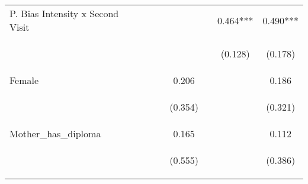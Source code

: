 \begin{center}
\begin{tabular}{lcccccc}
P. Bias Intensity x Second Visit &  &  &  &  & 0.464*** & 0.490*** \\
\vspace{4pt} & \begin{footnotesize}\end{footnotesize} & \begin{footnotesize}\end{footnotesize} & \begin{footnotesize}\end{footnotesize} & \begin{footnotesize}\end{footnotesize} & \begin{footnotesize}(0.128)\end{footnotesize} & \begin{footnotesize}(0.178)\end{footnotesize} \\
Female &  &  & 0.206 &  &  & 0.186 \\
\vspace{4pt} & \begin{footnotesize}\end{footnotesize} & \begin{footnotesize}\end{footnotesize} & \begin{footnotesize}(0.354)\end{footnotesize} & \begin{footnotesize}\end{footnotesize} & \begin{footnotesize}\end{footnotesize} & \begin{footnotesize}(0.321)\end{footnotesize} \\
Mother\_has\_diploma &  &  & 0.165 &  &  & 0.112 \\
\vspace{4pt} & \begin{footnotesize}\end{footnotesize} & \begin{footnotesize}\end{footnotesize} & \begin{footnotesize}(0.555)\end{footnotesize} & \begin{footnotesize}\end{footnotesize} & \begin{footnotesize}\end{footnotesize} & \begin{footnotesize}(0.386)\end{footnotesize} \\

\end{tabular}
\end{center}
